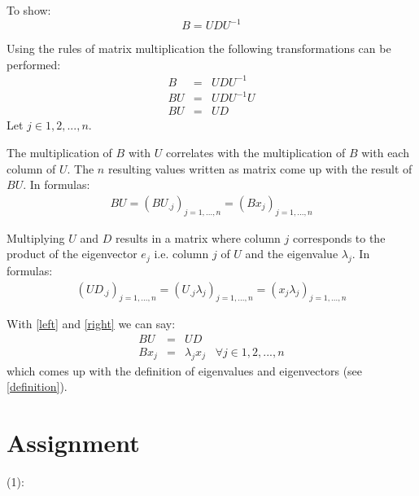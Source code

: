 \documentclass{article}
\begin{document}
To show:
\begin{equation}
B = UDU^{-1}
\end{equation}

Using the rules of matrix multiplication the following transformations can be performed:
\begin{eqnarray}
B &=& UDU^{-1}\\
BU &=& UDU^{-1}U\\
BU &=& UD
\end{eqnarray}
Let $j \in {1, 2, ..., n}$.

The multiplication of $B$ with $U$ correlates with the multiplication of $B$ with each column of $U$. The $n$ resulting values written as matrix come up with the result of $BU$. In formulas:
 \begin{eqnarray}
 BU = (BU_{.j})_{j=1,...,n} = (B x_j)_{j=1,...,n}
 \label{left}
 \end{eqnarray}
 
Multiplying $U$ and $D$ results in a matrix where column $j$ corresponds to the product of the eigenvector $e_j$ i.e. column $j$ of $U$ and the eigenvalue $\lambda _j$. In formulas:
\begin{eqnarray}
(UD_{.j})_{j = 1,...,n} = (U_{.j}\lambda_j)_{j = 1,...,n} = (x_j \lambda_j)_{j=1,...,n}
\label{right}
\end{eqnarray}

With \ref{left} and \ref{right} we can say:
\begin{eqnarray}
BU &=& UD\\
B x_j &=& \lambda_j x_j \;\;\; \forall j \in {1,2,...,n}
\end{eqnarray}
which comes up with the definition of eigenvalues and eigenvectors (see \ref{definition}).


\section{Assignment}		%
(1):
\end{document}
